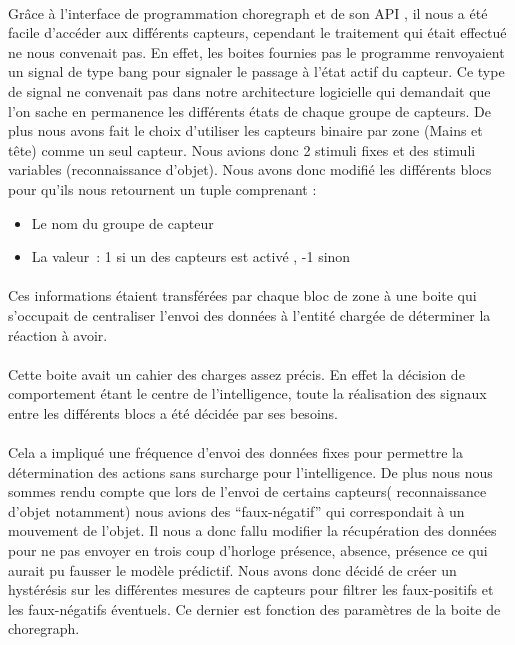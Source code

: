 
\paragraph{}
Grâce à l'interface de programmation choregraph et de son API , il nous a été
facile d'accéder aux différents capteurs, cependant le traitement qui était
effectué ne nous convenait pas. En effet, les boites fournies pas le programme
renvoyaient un signal de type bang pour signaler le passage à l'état actif du
capteur. Ce type de signal ne convenait pas dans notre architecture logicielle
qui demandait que l'on sache en permanence les différents états de chaque
groupe de capteurs. De plus nous avons fait le choix d'utiliser les capteurs
binaire par zone (Mains et tête) comme un seul capteur. Nous avions donc 2 stimuli fixes et
des stimuli variables (reconnaissance d'objet). Nous avons donc modifié les
différents blocs pour qu'ils nous retournent un tuple comprenant :
\begin{itemize}
  \item Le nom du groupe de capteur
  \item La valeur~: 1 si un des capteurs est activé , -1 sinon
\end{itemize}

\paragraph{}
Ces informations étaient transférées par chaque bloc de zone à une boite qui
s'occupait de centraliser l'envoi des données à l'entité chargée de déterminer la
réaction à avoir.

\paragraph{}
Cette boite avait un cahier des charges assez précis. En effet la décision de
comportement étant le centre de l'intelligence, toute la réalisation des signaux
entre les différents blocs a été décidée par ses besoins.

\paragraph{}
Cela a impliqué une fréquence d'envoi des données fixes pour permettre la
détermination des actions sans surcharge pour l'intelligence. De plus nous
nous sommes rendu compte que lors de l'envoi de certains capteurs(
reconnaissance d'objet notamment) nous avions des ``faux-négatif'' qui
correspondait à un mouvement de l'objet. Il nous a donc fallu modifier la
récupération des données pour ne pas envoyer en trois coup d'horloge
présence, absence, présence ce qui aurait pu fausser le modèle prédictif.
Nous avons donc décidé de créer un hystérésis sur les différentes mesures de
capteurs pour filtrer les faux-positifs et les faux-négatifs éventuels. Ce
dernier est fonction des paramètres de la boite de choregraph.

\paragraph{}




